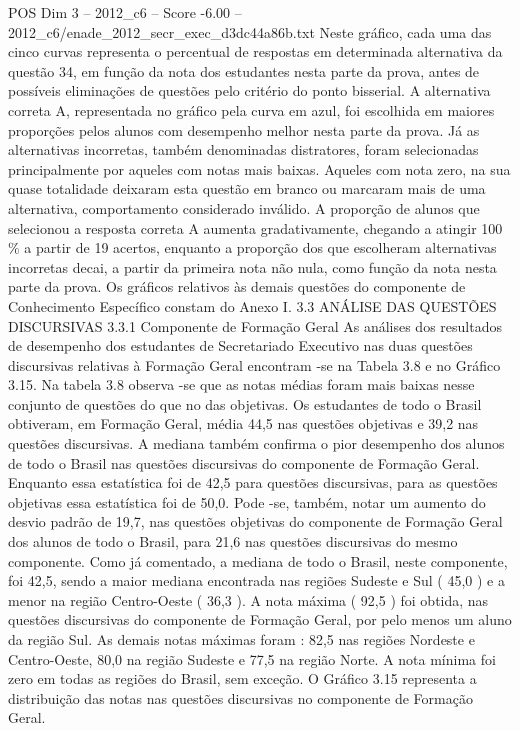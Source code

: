 \begin{textsample}{POS Dim 3 – 2012\_c6 – Score -6.00 – 2012\_c6/enade\_2012\_secr\_exec\_d3dc44a86b.txt}
Neste gráfico, cada uma das cinco curvas representa o percentual de respostas em determinada alternativa da questão 34, em função da nota dos estudantes nesta parte da prova, antes de possíveis eliminações de questões pelo critério do ponto bisserial.
A alternativa correta A, representada no gráfico pela curva em azul, foi escolhida em maiores proporções pelos alunos com desempenho melhor nesta parte da prova.
Já as alternativas incorretas, também denominadas distratores, foram selecionadas principalmente por aqueles com notas mais baixas.
Aqueles com nota zero, na sua quase totalidade deixaram esta questão em branco ou marcaram mais de uma alternativa, comportamento considerado inválido.
A proporção de alunos que selecionou a resposta correta A aumenta gradativamente, chegando a atingir 100 \% a partir de 19 acertos, enquanto a proporção dos que escolheram alternativas incorretas decai, a partir da primeira nota não nula, como função da nota nesta parte da prova.
Os gráficos relativos às demais questões do componente de Conhecimento Específico constam do Anexo I. 3.3 ANÁLISE DAS QUESTÕES DISCURSIVAS 3.3.1 Componente de Formação Geral As análises dos resultados de desempenho dos estudantes de Secretariado Executivo nas duas questões discursivas relativas à Formação Geral encontram -se na Tabela 3.8 e no Gráfico 3.15.
Na tabela 3.8 observa -se que as notas médias foram mais baixas nesse conjunto de questões do que no das objetivas.
Os estudantes de todo o Brasil obtiveram, em Formação Geral, média 44,5 nas questões objetivas e 39,2 nas questões discursivas.
A mediana também confirma o pior desempenho dos alunos de todo o Brasil nas questões discursivas do componente de Formação Geral.
Enquanto essa estatística foi de 42,5 para questões discursivas, para as questões objetivas essa estatística foi de 50,0.
Pode -se, também, notar um aumento do desvio padrão de 19,7, nas questões objetivas do componente de Formação Geral dos alunos de todo o Brasil, para 21,6 nas questões discursivas do mesmo componente.
Como já comentado, a mediana de todo o Brasil, neste componente, foi 42,5, sendo a maior mediana encontrada nas regiões Sudeste e Sul ( 45,0 ) e a menor na região Centro-Oeste ( 36,3 ).
A nota máxima ( 92,5 ) foi obtida, nas questões discursivas do componente de Formação Geral, por pelo menos um aluno da região Sul.
As demais notas máximas foram : 82,5 nas regiões Nordeste e Centro-Oeste, 80,0 na região Sudeste e 77,5 na região Norte.
A nota mínima foi zero em todas as regiões do Brasil, sem exceção.
O Gráfico 3.15 representa a distribuição das notas nas questões discursivas no componente de Formação Geral.

\end{textsample}
